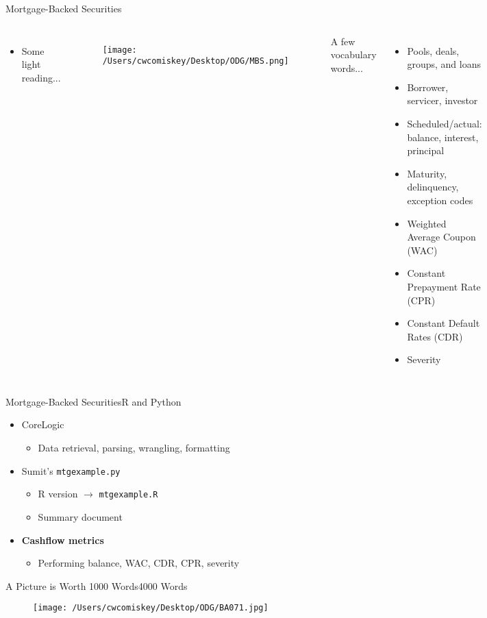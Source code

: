 \documentclass{beamer}
\begin{document}
\begin{frame}{Mortgage-Backed Securities}
\begin{columns}

\begin{itemize}
\item Some light reading...
\end{itemize}
        \begin{figure}[H]
      	\centering
      	\texttt{[image: /Users/cwcomiskey/Desktop/ODG/MBS.png]}
      	\end{figure}

A few vocabulary words...
  \begin{itemize}
  \item Pools, deals, groups, and loans
  \item Borrower, servicer, investor
  \item Scheduled/actual: balance, interest, principal
  \item Maturity, delinquency, exception codes
  \item Weighted Average Coupon (WAC)
  \item Constant Prepayment Rate (CPR)
  \item Constant Default Rates (CDR)
  \item Severity
  \end{itemize}

\end{columns}
\end{frame}

\begin{frame}[fragile]{Mortgage-Backed Securities}{R and Python}

\begin{itemize}
\addtolength{\itemsep}{0.5\baselineskip}
\item CoreLogic
    \begin{itemize}
    \item Data retrieval, parsing, wrangling, formatting
    \end{itemize}
\item Sumit's \verb|mtgexample.py|
    \begin{itemize}
    \item R version $\rightarrow$ \verb|mtgexample.R|
    \item Summary document
    \end{itemize}
\item {\bf Cashflow metrics}
    \begin{itemize}
    \item Performing balance, WAC, CDR, CPR, severity
    \end{itemize}
\end{itemize}

\end{frame}

\begin{frame}{A Picture is Worth 1000 Words}{4000 Words}

    \begin{figure}[H]
  	\centering
  	\texttt{[image: /Users/cwcomiskey/Desktop/ODG/BA071.jpg]}
  	\end{figure}
\end{frame}
\end{document}
